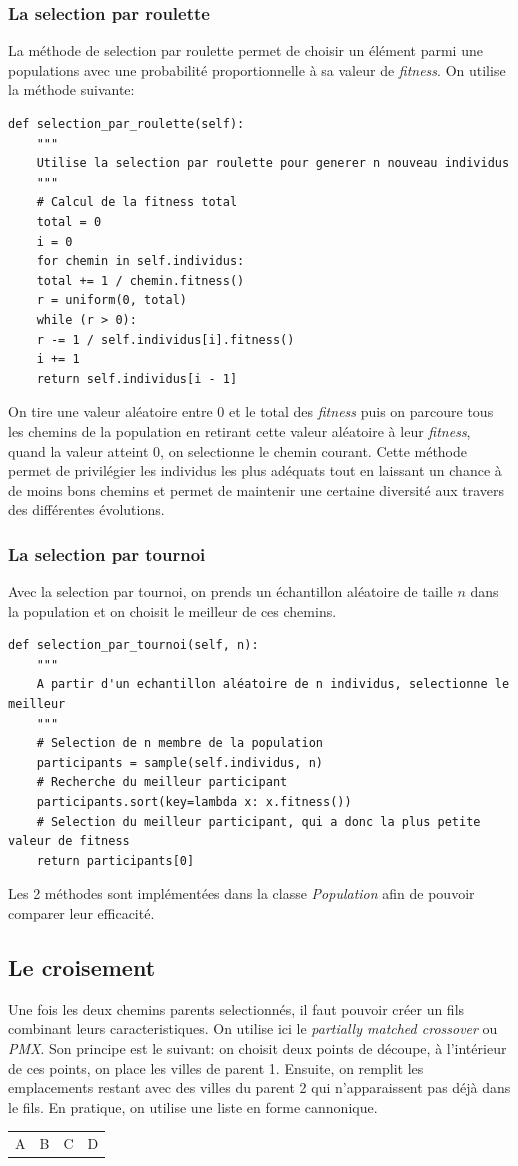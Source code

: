 \documentclass[11pt]{article}
\begin{document}
\subsubsection{La selection par roulette}
\label{sec-2-5-1}
La méthode de selection par roulette permet de choisir un élément parmi une populations avec une probabilité proportionnelle à sa valeur de \emph{fitness}.
On utilise la méthode suivante:
\begin{verbatim}
def selection_par_roulette(self):
    """
    Utilise la selection par roulette pour generer n nouveau individus
    """
    # Calcul de la fitness total
    total = 0
    i = 0
    for chemin in self.individus:
	total += 1 / chemin.fitness()
    r = uniform(0, total)
    while (r > 0):
	r -= 1 / self.individus[i].fitness()
	i += 1
    return self.individus[i - 1]
\end{verbatim}
On  tire une valeur aléatoire entre 0 et le total des \emph{fitness} puis on parcoure tous les chemins
de la population en retirant cette valeur aléatoire à leur \emph{fitness}, quand la valeur atteint 0, on 
selectionne le chemin courant. Cette méthode permet de privilégier les individus les plus adéquats
tout en laissant un chance à de moins bons chemins et permet de maintenir une certaine diversité
aux travers des différentes évolutions.

\subsubsection{La selection par tournoi}
\label{sec-2-5-2}
Avec la selection par tournoi, on prends un échantillon aléatoire de taille $n$ dans la population
et on choisit le meilleur de ces chemins.
\begin{verbatim}
def selection_par_tournoi(self, n):
    """
    A partir d'un echantillon aléatoire de n individus, selectionne le meilleur
    """
    # Selection de n membre de la population
    participants = sample(self.individus, n)
    # Recherche du meilleur participant
    participants.sort(key=lambda x: x.fitness())
    # Selection du meilleur participant, qui a donc la plus petite valeur de fitness
    return participants[0]
\end{verbatim}

Les 2 méthodes sont implémentées dans la classe \emph{Population} afin de pouvoir comparer leur efficacité.
\subsection{Le croisement}
\label{sec-2-6}
Une fois les deux chemins parents selectionnés, il faut pouvoir créer un fils combinant leurs 
caracteristiques. On utilise ici le \emph{partially matched crossover} ou \emph{PMX}. 
Son principe est le suivant: on choisit deux points de découpe, à l'intérieur de ces points, on place les villes de parent 1.
Ensuite, on remplit les emplacements restant avec des villes du parent 2 qui n'apparaissent pas déjà dans le fils.
En pratique, on utilise une liste en forme cannonique.

\begin{center}
\begin{tabular}{llll}
A & B & C & D\\
\end{tabular}
\end{center}
\end{document}
